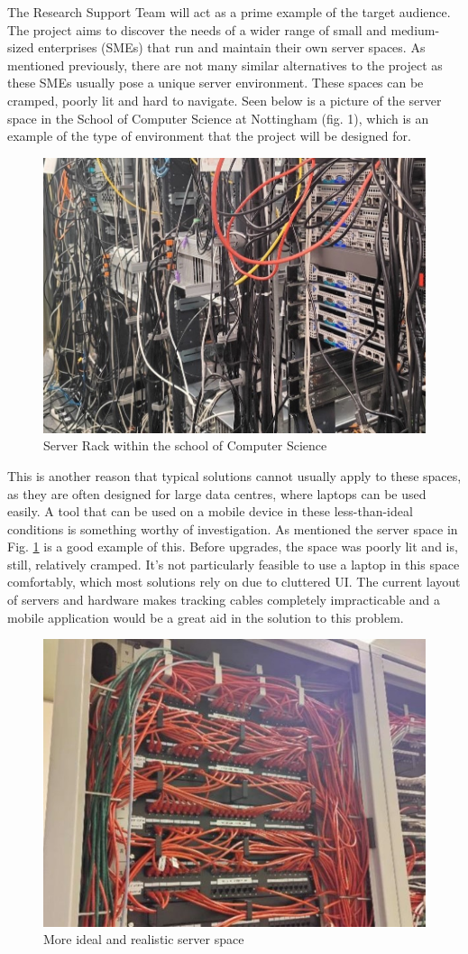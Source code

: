 \documentclass [11pt,a4paper]{article}
\begin{document}
The Research Support Team will act as a prime example of the target audience. The project aims to discover the needs of a wider range of small and medium-sized enterprises (SMEs) that run and maintain their own server spaces. As mentioned previously, there are not many similar alternatives to the project as these SMEs usually pose a unique server environment. These spaces can be cramped, poorly lit and hard to navigate. Seen below is a picture of the server space in the School of Computer Science at Nottingham (fig. 1), which is an example of the type of environment that the project will be designed for.
\begin{figure}[H]
    \centering
    \includegraphics[width=0.50\linewidth]{images/server_racks.jpg}
    \caption{Server Rack within the school of Computer Science}
    \label{fig:server_rack}
\end{figure}

This is another reason that typical solutions cannot usually apply to these spaces, as they are often designed for large data centres, where laptops can be used easily. A tool that can be used on a mobile device in these less-than-ideal conditions is something worthy of investigation. As mentioned the server space in Fig. \ref{fig:server_rack} is a good example of this. Before upgrades, the space was poorly lit and is, still, relatively cramped. It’s not particularly feasible to use a laptop in this space comfortably, which most solutions rely on due to cluttered UI. The current layout of servers and hardware makes tracking cables completely impracticable and a mobile application would be a great aid in the solution to this problem. 

\begin{figure}[H]
    \centering
    \includegraphics[width=0.55\linewidth]{images/server_racks_clean.jpg}
    \caption{More ideal and realistic server space}
    \label{fig:ideal_server_space}
\end{figure}
\end{document}
